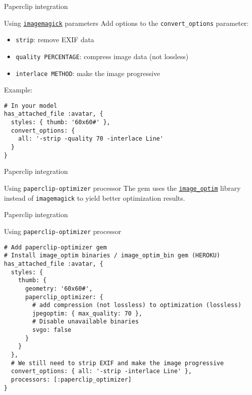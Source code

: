 \documentclass{beamer}
\begin{document}
\begin{frame}[fragile]{Paperclip integration}
\begin{block}{Using \href{http://imagemagick.org/}{\lstinline{imagemagick}} parameters}
Add options to the \lstinline{convert_options} parameter:
\begin{itemize}
  \item \lstinline{strip}: remove EXIF data
  \item \lstinline{quality PERCENTAGE}: compress image data (not lossless)
  \item \lstinline{interlace METHOD}: make the image progressive
\end{itemize}
Example:
\begin{lstlisting}
# In your model
has_attached_file :avatar, {
  styles: { thumb: '60x60#' },
  convert_options: {
    all: '-strip -quality 70 -interlace Line'
  }
}
\end{lstlisting}
\end{block}
\end{frame}

\begin{frame}[fragile]{Paperclip integration}
\begin{block}{Using \lstinline{paperclip-optimizer} processor}
The \href{https://github.com/janfoeh/paperclip-optimizer}{} gem uses the \href{https://github.com/toy/image_optim}{\lstinline{image_optim}} library
instead of \lstinline{imagemagick} to yield better optimization results.
\end{block}
\end{frame}

\begin{frame}[fragile]{Paperclip integration}
\begin{block}{Using \lstinline{paperclip-optimizer} processor}
\begin{lstlisting}
# Add paperclip-optimizer gem
# Install image_optim binaries / image_optim_bin gem (HEROKU)
has_attached_file :avatar, {
  styles: {
    thumb: {
      geometry: '60x60#',
      paperclip_optimizer: {
        # add compression (not lossless) to optimization (lossless)
        jpegoptim: { max_quality: 70 },
        # Disable unavailable binaries
        svgo: false
      }
    }
  },
  # We still need to strip EXIF and make the image progressive
  convert_options: { all: '-strip -interlace Line' },
  processors: [:paperclip_optimizer]
}
\end{lstlisting}
\end{block}
\end{frame}
\end{document}
